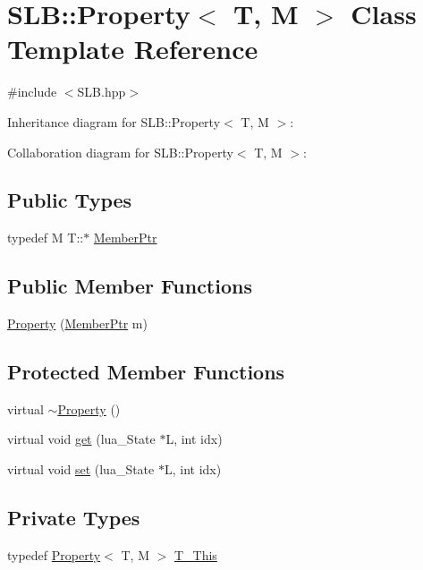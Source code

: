 \hypertarget{classSLB_1_1Property}{}\section{S\+LB\+:\+:Property$<$ T, M $>$ Class Template Reference}
\label{classSLB_1_1Property}


{\ttfamily \#include $<$S\+L\+B.\+hpp$>$}



Inheritance diagram for S\+LB\+:\+:Property$<$ T, M $>$\+:


Collaboration diagram for S\+LB\+:\+:Property$<$ T, M $>$\+:
\subsection*{Public Types}
\begin{DoxyCompactItemize}
\item 
typedef M T\+::$\ast$ \hyperlink{classSLB_1_1Property_a541f26b6822fdda94191912a156e895f}{Member\+Ptr}
\end{DoxyCompactItemize}
\subsection*{Public Member Functions}
\begin{DoxyCompactItemize}
\item 
\hyperlink{classSLB_1_1Property_aa51e5e9ba50ec03f997e08b1e7a5b243}{Property} (\hyperlink{classSLB_1_1Property_a541f26b6822fdda94191912a156e895f}{Member\+Ptr} m)
\end{DoxyCompactItemize}
\subsection*{Protected Member Functions}
\begin{DoxyCompactItemize}
\item 
virtual \hyperlink{classSLB_1_1Property_ab1c4960c9c0f53382162b3136771dab8}{$\sim$\+Property} ()
\item 
virtual void \hyperlink{classSLB_1_1Property_a15e6cb6a952cac783ec65a483e7dfb04}{get} (lua\+\_\+\+State $\ast$L, int idx)
\item 
virtual void \hyperlink{classSLB_1_1Property_a0a728262c501bc7f28c835063ee7a0bf}{set} (lua\+\_\+\+State $\ast$L, int idx)
\end{DoxyCompactItemize}
\subsection*{Private Types}
\begin{DoxyCompactItemize}
\item 
typedef \hyperlink{classSLB_1_1Property}{Property}$<$ T, M $>$ \hyperlink{classSLB_1_1Property_ac665de45ed6410c4b8ad1c5eb4b26c14}{T\+\_\+\+This}
\end{DoxyCompactItemize}
